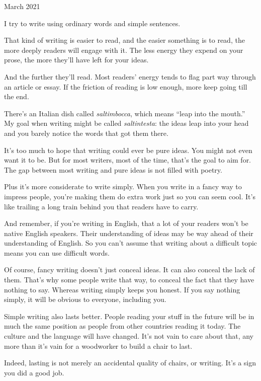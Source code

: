 March 2021

I try to write using ordinary words and simple sentences.

That kind of writing is easier to read, and the easier something is to
read, the more deeply readers will engage with it. The less energy they
expend on your prose, the more they'll have left for your ideas.

And the further they'll read. Most readers' energy tends to flag part
way through an article or essay. If the friction of reading is low
enough, more keep going till the end.

There's an Italian dish called \emph{saltimbocca}, which means ``leap
into the mouth.'' My goal when writing might be called
\emph{saltintesta}: the ideas leap into your head and you barely notice
the words that got them there.

It's too much to hope that writing could ever be pure ideas. You might
not even want it to be. But for most writers, most of the time, that's
the goal to aim for. The gap between most writing and pure ideas is not
filled with poetry.

Plus it's more considerate to write simply. When you write in a fancy
way to impress people, you're making them do extra work just so you can
seem cool. It's like trailing a long train behind you that readers have
to carry.

And remember, if you're writing in English, that a lot of your readers
won't be native English speakers. Their understanding of ideas may be
way ahead of their understanding of English. So you can't assume that
writing about a difficult topic means you can use difficult words.

Of course, fancy writing doesn't just conceal ideas. It can also conceal
the lack of them. That's why some people write that way, to conceal the
fact that they have
\href{https://scholar.google.com/scholar?hl=en&as_sdt=0\%2C5&q=hermeneutic+dialectics+hegemonic+modalities}{}nothing
to say. Whereas writing simply keeps you honest. If you say nothing
simply, it will be obvious to everyone, including you.

Simple writing also lasts better. People reading your stuff in the
future will be in much the same position as people from other countries
reading it today. The culture and the language will have changed. It's
not vain to care about that, any more than it's vain for a woodworker to
build a chair to last.

Indeed, lasting is not merely an accidental quality of chairs, or
writing. It's a sign you did a good job.

